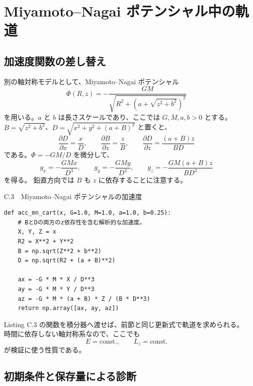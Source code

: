 \section{Miyamoto--Nagai ポテンシャル中の軌道}
\label{sec:appC-mn}

\subsection{加速度関数の差し替え}

別の軸対称モデルとして、Miyamoto--Nagai ポテンシャル
\begin{equation}
 \Phi(R,z)=-\frac{GM}{\sqrt{R^2+(a+\sqrt{z^2+b^2})^2}}
\label{eq:appC-mn-potential}
\end{equation}
を用いる。$a$ と $b$ は長さスケールであり、ここでは $G,M,a,b>0$ とする。
$B=\sqrt{z^2+b^2}$、$D=\sqrt{x^2+y^2+(a+B)^2}$ と置くと、
\begin{equation}
 \frac{\partial D}{\partial x}=\frac{x}{D},\qquad
 \frac{\partial B}{\partial z}=\frac{z}{B},\qquad
 \frac{\partial D}{\partial z}=\frac{(a+B)z}{BD}
\end{equation}
である。$\Phi=-GM/D$ を微分して、
\begin{equation}
 g_x=-\frac{GMx}{D^3},\qquad
 g_y=-\frac{GMy}{D^3},\qquad
 g_z=-\frac{GM(a+B)z}{BD^3}
\label{eq:appC-mn-acceleration}
\end{equation}
を得る。
鉛直方向では $B$ も $z$ に依存することに注意する。

\begin{listingbox}{C.3　Miyamoto--Nagai ポテンシャルの加速度}
\begin{Verbatim}[fontsize=\small,xleftmargin=1mm]
def acc_mn_cart(x, G=1.0, M=1.0, a=1.0, b=0.25):
    # BとDの両方のz依存性を含む解析的な加速度。
    X, Y, Z = x
    R2 = X**2 + Y**2
    B = np.sqrt(Z**2 + b**2)
    D = np.sqrt(R2 + (a + B)**2)

    ax = -G * M * X / D**3
    ay = -G * M * Y / D**3
    az = -G * M * (a + B) * Z / (B * D**3)
    return np.array([ax, ay, az])
\end{Verbatim}
\end{listingbox}


Listing C.3 の関数を積分器へ渡せば、前節と同じ更新式で軌道を求められる。
時間に依存しない軸対称系なので、ここでも
\begin{equation}
 E=\mathrm{const.},\qquad L_z=\mathrm{const.}
\label{eq:appC-mn-invariants}
\end{equation}
が検証に使う性質である。

\subsection{初期条件と保存量による診断}


